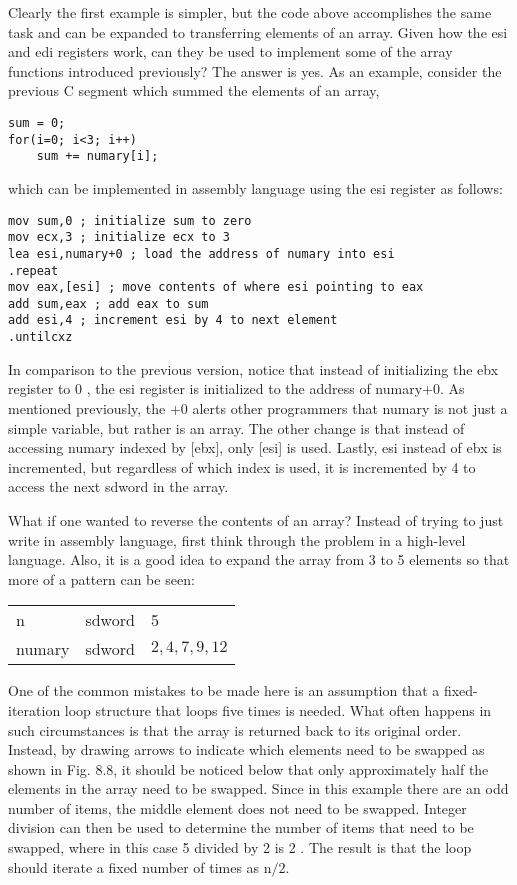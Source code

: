 \documentclass[10pt]{article}
\begin{document}
Clearly the first example is simpler, but the code above accomplishes the same task and can be expanded to transferring elements of an array. Given how the esi and edi registers work, can they be used to implement some of the array functions introduced previously? The answer is yes. As an example, consider the previous C segment which summed the elements of an array,

\begin{verbatim}
sum = 0;
for(i=0; i<3; i++)
    sum += numary[i];
\end{verbatim}

which can be implemented in assembly language using the esi register as follows:

\begin{verbatim}
mov sum,0 ; initialize sum to zero
mov ecx,3 ; initialize ecx to 3
lea esi,numary+0 ; load the address of numary into esi
.repeat
mov eax,[esi] ; move contents of where esi pointing to eax
add sum,eax ; add eax to sum
add esi,4 ; increment esi by 4 to next element
.untilcxz
\end{verbatim}

In comparison to the previous version, notice that instead of initializing the ebx register to 0 , the esi register is initialized to the address of numary+0. As mentioned previously, the +0 alerts other programmers that numary is not just a simple variable, but rather is an array. The other change is that instead of accessing numary indexed by [ebx], only [esi] is used. Lastly, esi instead of ebx is incremented, but regardless of which index is used, it is incremented by 4 to access the next sdword in the array.

What if one wanted to reverse the contents of an array? Instead of trying to just write in assembly language, first think through the problem in a high-level language. Also, it is a good idea to expand the array from 3 to 5 elements so that more of a pattern can be seen:

\begin{center}
\begin{tabular}{lll}
n & sdword & 5 \\
numary & sdword & $2,4,7,9,12$ \\
\end{tabular}
\end{center}

One of the common mistakes to be made here is an assumption that a fixed-iteration loop structure that loops five times is needed. What often happens in such circumstances is that the array is returned back to its original order. Instead, by drawing arrows to indicate which elements need to be swapped as shown in Fig. 8.8, it should be noticed below that only approximately half the elements in the array need to be swapped. Since in this example there are an odd number of items, the middle element does not need to be swapped. Integer division can then be used to determine the number of items that need to be swapped, where in this case 5 divided by 2 is 2 . The result is that the loop should iterate a fixed number of times as $\mathrm{n} / 2$.
\end{document}

